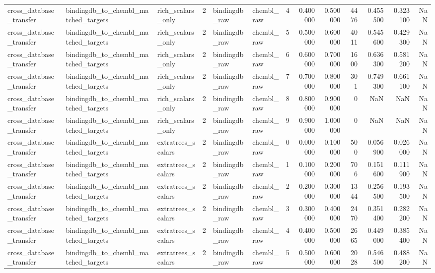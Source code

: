 \begin{longtable}{lllrllrrrrrrr}
cross\_database\_transfer & bindingdb\_to\_chembl\_matched\_targets & rich\_scalars\_only & 2 & bindingdb\_raw & chembl\_raw & 4 & 0.400000 & 0.500000 & 4476 & 0.455500 & 0.323100 & NaN \\
cross\_database\_transfer & bindingdb\_to\_chembl\_matched\_targets & rich\_scalars\_only & 2 & bindingdb\_raw & chembl\_raw & 5 & 0.500000 & 0.600000 & 4011 & 0.545600 & 0.429300 & NaN \\
cross\_database\_transfer & bindingdb\_to\_chembl\_matched\_targets & rich\_scalars\_only & 2 & bindingdb\_raw & chembl\_raw & 6 & 0.600000 & 0.700000 & 1600 & 0.636300 & 0.581200 & NaN \\
cross\_database\_transfer & bindingdb\_to\_chembl\_matched\_targets & rich\_scalars\_only & 2 & bindingdb\_raw & chembl\_raw & 7 & 0.700000 & 0.800000 & 301 & 0.749300 & 0.661100 & NaN \\
cross\_database\_transfer & bindingdb\_to\_chembl\_matched\_targets & rich\_scalars\_only & 2 & bindingdb\_raw & chembl\_raw & 8 & 0.800000 & 0.900000 & 0 & NaN & NaN & NaN \\
cross\_database\_transfer & bindingdb\_to\_chembl\_matched\_targets & rich\_scalars\_only & 2 & bindingdb\_raw & chembl\_raw & 9 & 0.900000 & 1.000000 & 0 & NaN & NaN & NaN \\
cross\_database\_transfer & bindingdb\_to\_chembl\_matched\_targets & extratrees\_scalars & 2 & bindingdb\_raw & chembl\_raw & 0 & 0.000000 & 0.100000 & 500 & 0.056900 & 0.026000 & NaN \\
cross\_database\_transfer & bindingdb\_to\_chembl\_matched\_targets & extratrees\_scalars & 2 & bindingdb\_raw & chembl\_raw & 1 & 0.100000 & 0.200000 & 706 & 0.151600 & 0.111900 & NaN \\
cross\_database\_transfer & bindingdb\_to\_chembl\_matched\_targets & extratrees\_scalars & 2 & bindingdb\_raw & chembl\_raw & 2 & 0.200000 & 0.300000 & 1344 & 0.256500 & 0.193500 & NaN \\
cross\_database\_transfer & bindingdb\_to\_chembl\_matched\_targets & extratrees\_scalars & 2 & bindingdb\_raw & chembl\_raw & 3 & 0.300000 & 0.400000 & 2470 & 0.351400 & 0.282200 & NaN \\
cross\_database\_transfer & bindingdb\_to\_chembl\_matched\_targets & extratrees\_scalars & 2 & bindingdb\_raw & chembl\_raw & 4 & 0.400000 & 0.500000 & 2665 & 0.449000 & 0.385400 & NaN \\
cross\_database\_transfer & bindingdb\_to\_chembl\_matched\_targets & extratrees\_scalars & 2 & bindingdb\_raw & chembl\_raw & 5 & 0.500000 & 0.600000 & 2028 & 0.546500 & 0.488200 & NaN \\

\end{longtable}
